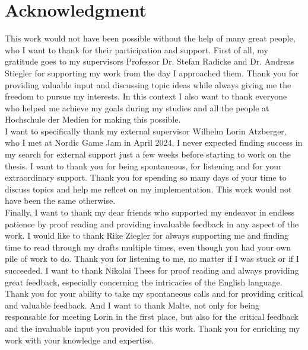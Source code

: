 \chapter{Acknowledgment}

This work would not have been possible without the help of many great people, who I want to thank for their 
participation and support. First of all, my gratitude goes to my supervisors Professor Dr. Stefan Radicke 
and Dr. Andreas Stiegler for supporting my work from the day I approached them. Thank you for providing 
valuable input and discussing topic ideas while always giving me the freedom to pursue my interests. In 
this context I also want to thank everyone who helped me achieve my goals during my studies and all the 
people at Hochschule der Medien for making this possible. \\

\noindent
I want to specifically thank my external supervisor Wilhelm Lorin Atzberger, who I met at Nordic Game Jam 
in April 2024. I never expected finding success in my search for external support just a few weeks before 
starting to work on the thesis. I want to thank you for being spontaneous, for listening and for your 
extraordinary support. Thank you for spending so many days of your time to discuss topics and help me 
reflcet on my implementation. This work would not have been the same otherwise. \\

\noindent
Finally, I want to thank my dear friends who supported my endeavor in endless patience by proof reading and 
providing invaluable feedback in any aspect of the work. I would like to thank Rike Ziegler for always 
supporting me and finding time to read through my drafts multiple times, even though you had your own 
pile of work to do. Thank you for listening to me, no matter if I was stuck or if I succeeded. 
I want to thank Nikolai Thees for proof reading and always providing great feedback, especially concerning 
the intricacies of the English language. Thank you for your ability to take my spontaneous calls and for 
providing critical and valuable feedback. And I want to thank Malte, not only for being responsable for 
meeting Lorin in the first place, but also for the critical feedback and the invaluable input you provided 
for this work. Thank you for enriching my work with your knowledge and expertise. \\
